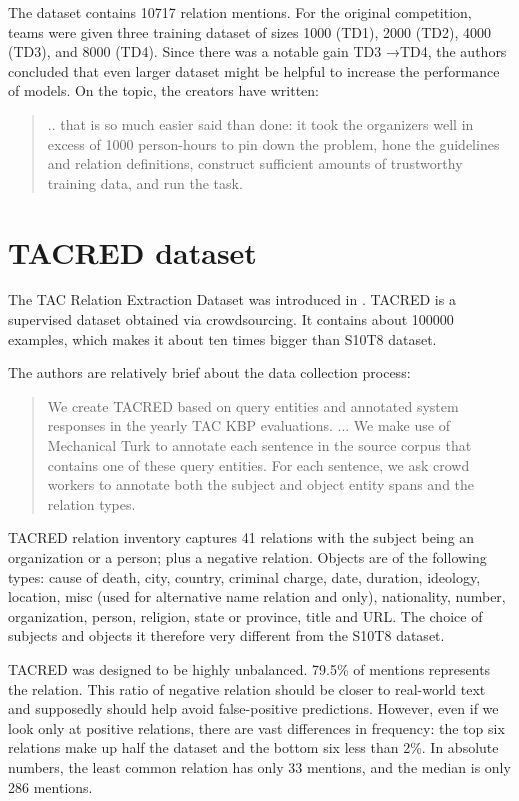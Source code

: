 The dataset contains \num{10717} relation mentions. For the original competition, teams were given three training dataset of sizes \num{1000} (TD1), \num{2000} (TD2), \num{4000} (TD3), and \num{8000} (TD4). Since there was a notable gain TD3 →TD4, the authors concluded that even larger dataset might be helpful to increase the performance of models. On the topic, the creators have written:

\begin{quotation}.. that is so much easier said than done: it took the organizers well in excess of \num{1000} person-hours to pin down the problem, hone the guidelines and
relation definitions, construct sufficient amounts of trustworthy training data, and run the task.
\end{quotation}




\section{TACRED dataset}
The TAC Relation Extraction Dataset was introduced in \citep{zhang2017tacred}. TACRED is a supervised dataset obtained via crowdsourcing. It contains about \num{100000} examples, which makes it about ten times bigger than S10T8 dataset. 

The authors are relatively brief about the data collection process:

\begin{quote}
We create TACRED based on query entities and annotated system responses in the yearly TAC KBP evaluations. ... We make use of Mechanical Turk to annotate each sentence in the source corpus that contains one of these query entities. For each sentence, we ask crowd workers to annotate both the subject and object entity spans and the relation types.
\end{quote}

TACRED relation inventory captures 41 relations with the subject being an organization or a person; plus a negative relation. Objects are of the following types: cause of death, city, country, criminal charge, date, duration, ideology, location, misc (used for alternative name relation and  only), nationality, number, organization, person, religion, state or province, title and URL. The choice of subjects and objects it therefore very different from the S10T8 dataset.


TACRED was designed to be highly unbalanced. 79.5\% of mentions represents the   relation. This ratio of negative relation should be closer to real-world text and supposedly should help avoid false-positive predictions. However, even if we look only at positive relations, there are vast differences in frequency: the top six relations make up half the dataset and the bottom six less than 2\%. In absolute numbers, the least common  relation has only 33 mentions, and the median is only 286 mentions.
 

